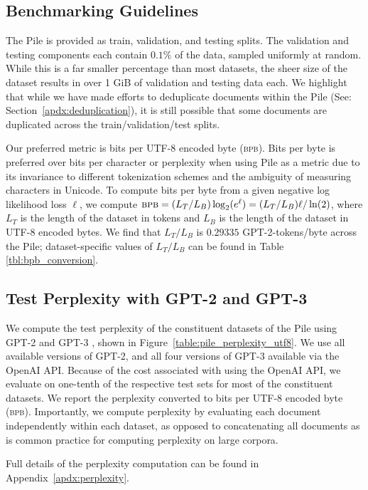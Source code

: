 \documentclass[11pt,a4paper]{article}
\begin{document}
\subsection{Benchmarking Guidelines}

The Pile is provided as train, validation, and testing splits. The validation and testing components each contain $0.1\%$ of the data, sampled uniformly at random. While this is a far smaller percentage than most datasets, the sheer size of the dataset results in over 1 GiB of validation and testing data each. We highlight that while we have made efforts to deduplicate documents within the Pile (See: Section~\ref{apdx:deduplication}), it is still possible that some documents are duplicated across the train/validation/test splits.

Our preferred metric is bits per UTF-8 encoded byte (\textsc{bpb}). Bits per byte is preferred over bits per character or perplexity when using Pile as a metric due to its invariance to different tokenization schemes and the ambiguity of measuring characters in Unicode. To compute bits per byte from a given negative log likelihood loss $\ell$, we compute $\textsc{bpb} = (L_T/L_B) \log_2(e^\ell) = (L_T/L_B) \ell / \ln(2)$, where $L_T$ is the length of the dataset in tokens and $L_B$ is the length of the dataset in UTF-8 encoded bytes. We find that $L_T/L_B$ is $0.29335$ GPT-2-tokens/byte across the Pile; dataset-specific values of $L_T/L_B$ can be found in Table \ref{tbl:bpb_conversion}.

\subsection{Test Perplexity with GPT-2 and GPT-3}


We compute the test perplexity of the constituent datasets of the Pile using GPT-2 \citep{GPT2} and GPT-3 \citep{GPT3}, shown in Figure~\ref{table:pile_perplexity_utf8}. We use all available versions of GPT-2, and all four versions of GPT-3 available via the OpenAI API. Because of the cost associated with using the OpenAI API, we evaluate on one-tenth of the respective test sets for most of the constituent datasets. We report the perplexity converted to bits per UTF-8 encoded byte (\textsc{bpb}). Importantly, we compute perplexity by evaluating each document independently within each dataset, as opposed to concatenating all documents as is common practice for computing perplexity on large corpora.

Full details of the perplexity computation can be found in Appendix~\ref{apdx:perplexity}.
\end{document}
